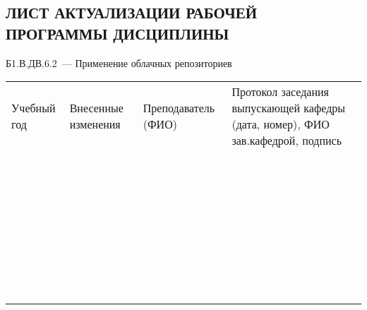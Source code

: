 \documentclass[a4paper,12pt]{article}
\begin{document}
\newpage
\begin{center}
\section*{ЛИСТ АКТУАЛИЗАЦИИ РАБОЧЕЙ ПРОГРАММЫ ДИСЦИПЛИНЫ}
Б1.В.ДВ.6.2\ --- Применение облачных репозиториев 
\end{center}

  \noindent
  \begin{tabular}{|p{15mm}|p{67mm}|p{25mm}|p{41mm}|}
    \hline
    \small\centering
    Учебный год 
    & \small\centering
    Внесенные изменения 
    & \small\centering
    Преподаватель (ФИО) 
    & \small\centering\arraybackslash
    Протокол заседания выпускающей кафедры (дата, номер), ФИО зав.кафедрой, подпись \\
    & & & \\\hline
    & & & \\\hline
    & & & \\\hline
    & & & \\\hline
    & & & \\\hline
    & & & \\\hline
    & & & \\\hline
    & & & \\\hline
    & & & \\\hline
    & & & \\\hline
    & & & \\\hline
    & & & \\\hline
    & & & \\\hline
    & & & \\\hline
    & & & \\\hline
    & & & \\\hline
    & & & \\\hline
    & & & \\\hline
    & & & \\\hline
    & & & \\\hline
    & & & \\\hline
    & & & \\\hline
    & & & \\\hline
    & & & \\\hline
    & & & \\\hline
    & & & \\\hline
    & & & \\\hline
    & & & \\\hline
    & & & \\\hline
    & & & \\\hline
    & & & \\\hline
    & & & \\\hline
    & & & \\\hline
    & & & \\\hline
    & & & \\\hline
    & & & \\\hline
  \end{tabular}
\end{document}
